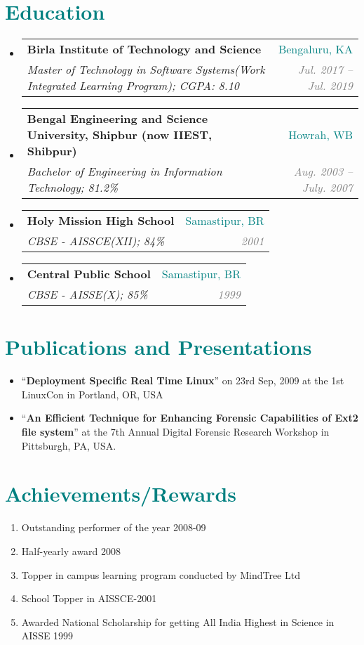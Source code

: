 \documentclass[letterpaper,11pt]{article}
\makeatletter
\newcommand{\resumeSubheading}[4]{
  \vspace{-1pt}\item
    \begin{tabular*}{0.97\textwidth}[t]{l@{\extracolsep{\fill}}r}
      \textbf{#1} & #2 \\
      \textit{\small#3} & \textit{\small #4} \\
    \end{tabular*}\vspace{-5pt}
}
\newcommand{\resumeSubHeadingListStart}{\begin{itemize}[leftmargin=*]}
\newcommand{\resumeSubHeadingListEnd}{\end{itemize}}
\makeatother
\begin{document}
\section{\textcolor{teal}{Education}}
  \resumeSubHeadingListStart
    \resumeSubheading
      {Birla Institute of Technology and Science}{\textcolor{teal}{Bengaluru, KA}}
      {Master of Technology in Software Systems(Work Integrated Learning Program);  CGPA: 8.10}{\textcolor{GRAY}{Jul. 2017 -- Jul. 2019}}
    \resumeSubheading
      {Bengal Engineering and Science University, Shipbur (now IIEST, Shibpur)}{\textcolor{teal}{Howrah, WB}}
      {Bachelor of Engineering in Information Technology;  81.2\% }{\textcolor{GRAY}{Aug. 2003 -- July. 2007}}
      \resumeSubheading
      {Holy Mission High School}{\textcolor{teal}{Samastipur, BR}}
      {CBSE - AISSCE(XII); 84\%}{\textcolor{GRAY}{2001}}
      \resumeSubheading
      {Central Public School}{\textcolor{teal}{Samastipur, BR}}
      {CBSE - AISSE(X); 85\%}{\textcolor{GRAY}{1999}}
  \resumeSubHeadingListEnd

\section{\textcolor{teal}{Publications and Presentations}}
  \resumeSubHeadingListStart
    \item {“\textbf{Deployment Specific Real Time Linux}” on 23rd Sep, 2009 at the 1st LinuxCon in Portland, OR, USA}
    \item  {“\textbf{An Efficient Technique for Enhancing Forensic Capabilities of Ext2 file system}” at the 7th Annual Digital Forensic Research Workshop in Pittsburgh, PA, USA.}
  \resumeSubHeadingListEnd
  
  

\section{\textcolor{teal}{Achievements/Rewards}}
  \begin{enumerate}
    \item{Outstanding performer of the year 2008-09}
    \item{Half-yearly award 2008}
    \item{Topper in campus learning program conducted by MindTree Ltd}
    \item{School Topper in AISSCE-2001}
    \item{Awarded National Scholarship for getting All India Highest in Science in AISSE 1999}  
    \end{enumerate}


\end{document}
